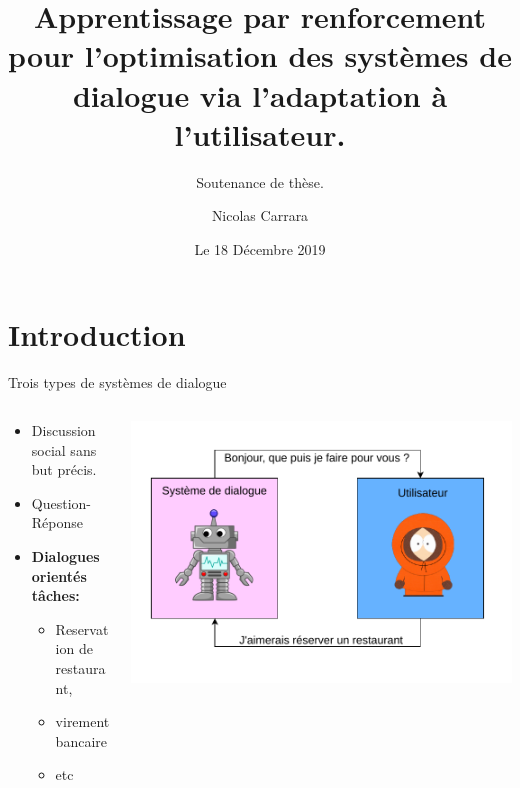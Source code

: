 \documentclass[french]{beamer}
\title[TITLE]{Apprentissage par renforcement pour l'optimisation des systèmes de dialogue via l'adaptation à l'utilisateur.}
\subtitle{Soutenance de thèse.}
\author{Nicolas Carrara}
\institute[ULille]{Université de Lille}
\date{Le 18 Décembre 2019}
\begin{document}
    \begin{frame}
        \maketitle
        \centering
    \end{frame}

    \section{Introduction}


    \begin{frame}{Trois types de systèmes de dialogue}
        \begin{columns}
            \begin{column}{0.5\textwidth}
                \begin{itemize}
                    \item Discussion social sans but précis.
                    \item Question-Réponse
                    \item \textbf{Dialogues orientés tâches:}
                    \begin{itemize}
                        \item Reservation de restaurant,
                        \item virement bancaire
                        \item etc
                    \end{itemize}
                \end{itemize}
            \end{column}
            \begin{column}{0.5\textwidth}  %
                \begin{center}
                    \includegraphics[width=1.0\textwidth]{drawio/out/sds.pdf}
                \end{center}
            \end{column}
        \end{columns}
    \end{frame}
\end{document}
